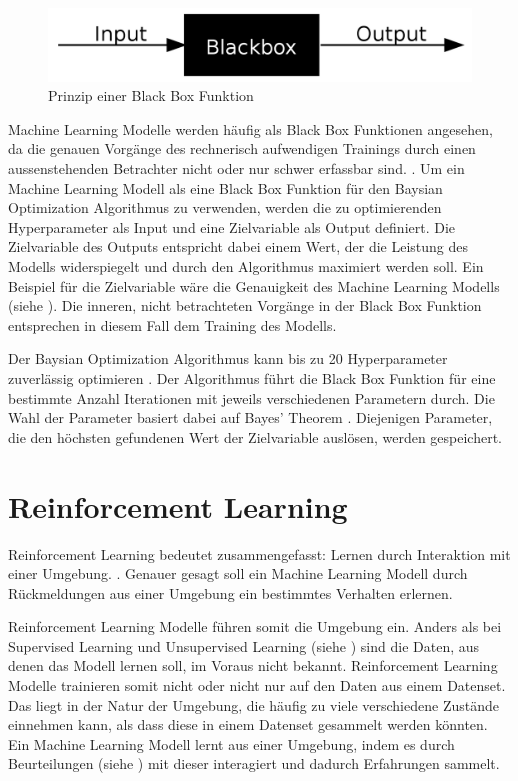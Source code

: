 \begin{figure}[!ht]
   \centering
   \includegraphics[width=\textwidth-2cm]{images/theorie/blackbox.png}
   \caption{Prinzip einer Black Box Funktion \cite{noauthor_black_2021}}\label{fig:blackbox}
\end{figure}
 
Machine Learning Modelle werden häufig als Black Box Funktionen angesehen, da
die genauen Vorgänge des rechnerisch aufwendigen Trainings durch einen
aussenstehenden Betrachter nicht oder nur schwer erfassbar sind.
\cite{robbins_machine_2017}. Um ein Machine Learning Modell als eine Black Box
Funktion für den Baysian Optimization Algorithmus zu verwenden, werden die zu
optimierenden Hyperparameter als Input und eine Zielvariable als Output
definiert. Die Zielvariable des Outputs entspricht dabei einem Wert, der die
Leistung des Modells widerspiegelt und durch den Algorithmus maximiert werden
soll. Ein Beispiel für die Zielvariable wäre die Genauigkeit des Machine Learning
Modells (siehe ). Die inneren, nicht betrachteten
Vorgänge in der Black Box Funktion entsprechen in diesem Fall dem Training des
Modells.
 
Der Baysian Optimization Algorithmus kann bis zu 20 Hyperparameter zuverlässig
optimieren \cite{moriconi_high-dimensional_2020}. Der Algorithmus führt die
Black Box Funktion für eine bestimmte Anzahl Iterationen mit jeweils
verschiedenen Parametern durch. Die Wahl der Parameter basiert dabei auf Bayes'
Theorem \cite[S. 7]{garnett_bayesian_nodate}. Diejenigen Parameter, die den
höchsten gefundenen Wert der Zielvariable auslösen, werden gespeichert.
 
 
\section{Reinforcement Learning}\label{chap:t_rl}
Reinforcement Learning bedeutet zusammengefasst: Lernen durch Interaktion mit
einer Umgebung. \cite{osinski_what_2018}. Genauer gesagt soll ein Machine
Learning Modell durch Rückmeldungen aus einer Umgebung ein bestimmtes Verhalten
erlernen.
 
Reinforcement Learning Modelle führen somit die Umgebung ein. Anders als bei
Supervised Learning und Unsupervised Learning (siehe ) sind
die Daten, aus denen das Modell lernen soll, im Voraus nicht bekannt.
Reinforcement Learning Modelle trainieren somit nicht oder nicht nur auf den
Daten aus einem Datenset. Das liegt in der Natur der Umgebung, die häufig zu
viele verschiedene Zustände einnehmen kann, als dass diese in einem Datenset
gesammelt werden könnten. Ein Machine Learning Modell lernt aus einer Umgebung,
indem es durch Beurteilungen (siehe ) mit dieser
interagiert und dadurch Erfahrungen sammelt.
\cite{piyush_verma_what_2021}
 
